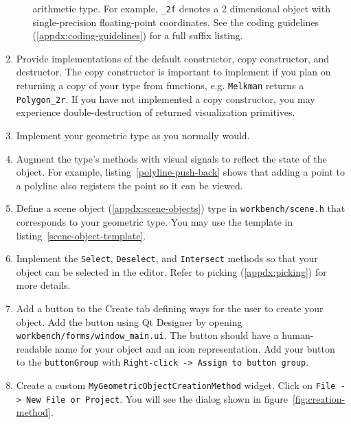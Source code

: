 \begin{enumerate}
\begin{itemize}
    arithmetic type. For example, \texttt{\_2f} denotes a 2 dimensional object
    with single-precision floating-point coordinates. See the coding
    guidelines (\ref{appdx:coding-guidelines}) for a full suffix listing.
  \end{itemize}
  
  \item Provide implementations of the default constructor, copy constructor,
  and destructor. The copy constructor is important to implement if you plan on
  returning a copy of your type from functions, e.g. \texttt{Melkman} returns a
  \texttt{Polygon\_2r}. If you have not implemented a copy constructor, you may
  experience double-destruction of returned visualization primitives.
  \item Implement your geometric type as you normally would.
  \item Augment the type's methods with visual signals to reflect the state of
  the object. For example, listing~\ref{polyline-push-back} shows that adding a
  point to a polyline also registers the point so it can be viewed.
  
  \item Define a scene object (\ref{appdx:scene-objects}) type in
  \texttt{workbench/scene.h} that corresponds to your geometric type. You may
  use the template in listing~\ref{scene-object-template}.
  
  \item Implement the \texttt{Select}, \texttt{Deselect}, and \texttt{Intersect}
  methods so that your object can be selected in the editor. Refer to
  picking (\ref{appdx:picking}) for more details.
  \item Add a button to the Create tab defining ways for the user to create your
  object. Add the button using Qt Designer by opening
  \texttt{workbench/forms/window\_main.ui}. The button should have a
  human-readable name for your object and an icon representation. Add your
  button to the \texttt{buttonGroup} with \texttt{Right-click -> Assign to
  button group}.
  \item  Create a custom \texttt{MyGeometricObjectCreationMethod} widget. Click
  on \texttt{File -> New File or Project}. You will see the dialog shown in
  figure~\ref{fig:creation-method}.
  \begin{figure}[htb]

\end{figure}
\end{enumerate}

